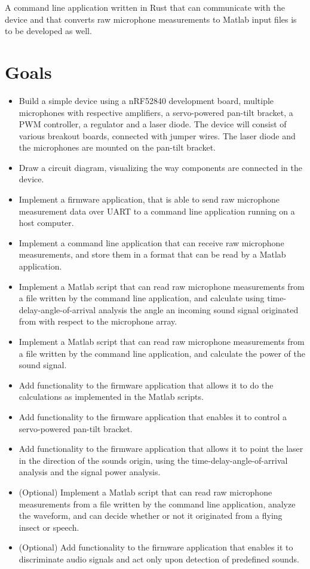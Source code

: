 \documentclass[a4paper]{article}
\begin{document}
A command line application written in Rust that can communicate with the device and that converts raw microphone measurements to Matlab input files is to be developed as well.

\section{Goals}
\begin{itemize}
    \item Build a simple device using a nRF52840 development board, multiple microphones with respective amplifiers, a servo-powered pan-tilt bracket, a PWM controller, a regulator and a laser diode. The device will consist of various breakout boards, connected with jumper wires. The laser diode and the microphones are mounted on the pan-tilt bracket.
    \item Draw a circuit diagram, visualizing the way components are connected in the device.
    \item Implement a firmware application, that is able to send raw microphone measurement data over UART\cite{uart} to a command line application running on a host computer.
    \item Implement a command line application that can receive raw microphone measurements, and store them in a format that can be read by a Matlab application.
    \item Implement a Matlab script that can read raw microphone measurements from a file written by the command line application, and calculate using time-delay-angle-of-arrival analysis the angle an incoming sound signal originated from with respect to the microphone array.
    \item Implement a Matlab script that can read raw microphone measurements from a file written by the command line application, and calculate the power of the sound signal.
    \item Add functionality to the firmware application that allows it to do the calculations as implemented in the Matlab scripts.
    \item Add functionality to the firmware application that enables it to control a servo-powered pan-tilt bracket.
    \item Add functionality to the firmware application that allows it to point the laser in the direction of the sounds origin, using the time-delay-angle-of-arrival analysis and the signal power analysis.
    \item (Optional) Implement a Matlab script that can read raw microphone measurements from a file written by the command line application, analyze the waveform, and can decide whether or not it originated from a flying insect or speech.
    \item (Optional) Add functionality to the firmware application that enables it to discriminate audio signals and act only upon detection of predefined sounds.
\end{itemize}
\end{document}
